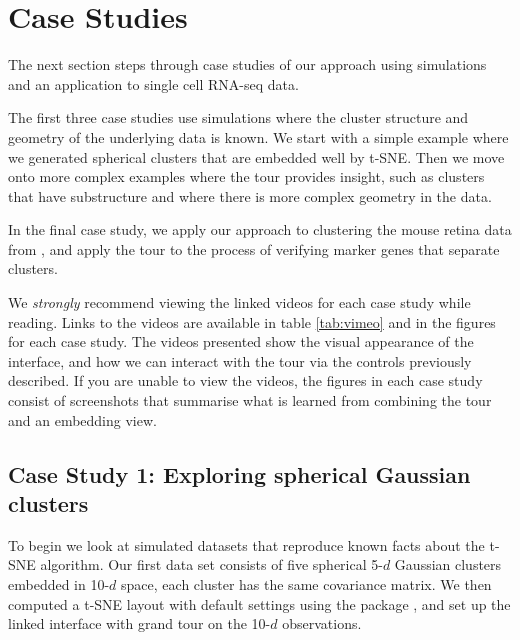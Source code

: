 \documentclass[article,notitle]{jdssv}
\begin{document}
\hypertarget{case-studies}{%
\section{Case Studies}\label{case-studies}}

The next section steps through case studies of our approach using simulations
and an application to single cell RNA-seq data.

The first three case studies use simulations where the cluster structure and
geometry of the underlying data is known. We start with a simple example
where we generated spherical clusters that are embedded well by t-SNE. Then
we move onto more complex examples where the tour provides insight, such
as clusters that have substructure and where there is more complex geometry
in the data.

In the final case study, we apply our approach to clustering
the mouse retina data from \citet{Macosko2015-ot}, and apply the tour
to the process of verifying marker genes that separate clusters.

We \emph{strongly} recommend viewing the linked videos for each case study
while reading. Links to the videos are available in table \ref{tab:vimeo}
and in the figures for each case study. The videos presented show the visual
appearance of the  interface, and how we can interact with the tour
via the controls previously described. If you are unable to view the videos,
the figures in each case study consist of screenshots that summarise what is
learned from combining the tour and an embedding view.

\hypertarget{case-study-1-exploring-spherical-gaussian-clusters}{%
\subsection{Case Study 1: Exploring spherical Gaussian clusters}\label{case-study-1-exploring-spherical-gaussian-clusters}}

To begin we look at simulated datasets that reproduce known facts
about the t-SNE algorithm. Our first data set consists of five spherical 5-\(d\)
Gaussian clusters embedded in 10-\(d\) space, each cluster has the same
covariance matrix. We then computed a t-SNE layout with default settings
using the  package \citep{Rtsne},
and set up the  linked interface with grand tour on the 10-\(d\)
observations.
\end{document}
